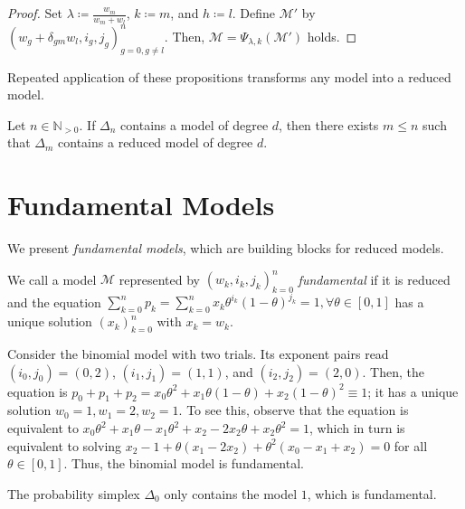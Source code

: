 \begin{proof}
    Set \( \lambda \coloneqq \frac{w_m}{w_m + w_l} \), \( k \coloneqq m \), and \( h \coloneqq l \). Define \( \mathcal{M}' \) by \(  \left( w_g + \delta_{gm}w_l, i_g, j_g  \right)^n_{g=0, g \neq l} \).
    Then, \( \mathcal{M} = \Psi_{\lambda,k}(\mathcal{M}') \) holds.
\end{proof}

Repeated application of these propositions transforms any model into a reduced model.

\begin{corollary}\label{cor:reduced-models}
    Let \( n \in \mathbb{N}_{> 0} \).
    If \( \Delta_n \) contains a model of degree \( d \), then there exists \( m \leq n \) such that \( \Delta_m \) contains a reduced model of degree \( d \).
\end{corollary}


\section{Fundamental Models}

We present \emph{fundamental models}, which are building blocks for reduced models.

\begin{definition}\label{def:fundamental-model}
    We call a model \( \mathcal{M} \) represented by \( (w_k, i_k, j_k)_{k=0}^n \) \emph{fundamental} if it is reduced and the equation \( \sum_{k=0}^n p_k  = \sum_{k=0}^n x_k \theta^{i_k} (1-\theta)^{j_k} = 1, \forall \theta \in [0,1] \) has a unique solution \( (x_k)_{k=0}^n \) with \( x_k = w_k \).
\end{definition}

\begin{example}
    Consider the binomial model with two trials. Its exponent pairs read \( (i_0, j_0) = (0,2) \), \( (i_1, j_1) = (1,1) \), and \( (i_2, j_2) = (2,0) \). Then, the equation is \( p_0 + p_1 + p_2 = x_0\theta^2 + x_1\theta(1-\theta) + x_2(1-\theta)^2 \equiv 1 \); it has a unique solution \( w_0 = 1, w_1 = 2, w_2 = 1 \). To see this, observe that the equation is equivalent to \( x_0\theta^2 + x_1\theta - x_1 \theta^2 + x_2 -2x_2\theta + x_2\theta^2 = 1\), which in turn is equivalent to solving \( x_2 - 1 + \theta(x_1 - 2x_2) + \theta^2(x_0 - x_1 + x_2) = 0 \) for all \( \theta \in [0,1] \). Thus, the binomial model is fundamental.
\end{example}

\begin{example}\label{ex:prob-simplex-0}
    The probability simplex \( \Delta_0 \) only contains the model \( 1 \), which is fundamental.
\end{example}


